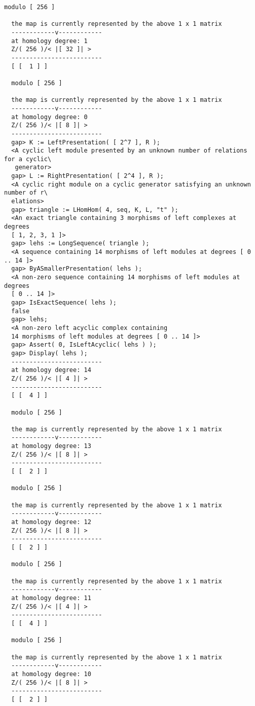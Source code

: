 \documentclass[a4paper,11pt]{report}
\begin{document}
{{{\begin{Verbatim}[fontsize=\small,frame=single,label=Example]
  modulo [ 256 ]
  
  the map is currently represented by the above 1 x 1 matrix
  ------------v------------
  at homology degree: 1
  Z/( 256 )/< |[ 32 ]| > 
  -------------------------
  [ [  1 ] ]
  
  modulo [ 256 ]
  
  the map is currently represented by the above 1 x 1 matrix
  ------------v------------
  at homology degree: 0
  Z/( 256 )/< |[ 8 ]| > 
  -------------------------
  gap> K := LeftPresentation( [ 2^7 ], R );
  <A cyclic left module presented by an unknown number of relations for a cyclic\
   generator>
  gap> L := RightPresentation( [ 2^4 ], R );
  <A cyclic right module on a cyclic generator satisfying an unknown number of r\
  elations>
  gap> triangle := LHomHom( 4, seq, K, L, "t" );
  <An exact triangle containing 3 morphisms of left complexes at degrees 
  [ 1, 2, 3, 1 ]>
  gap> lehs := LongSequence( triangle );
  <A sequence containing 14 morphisms of left modules at degrees [ 0 .. 14 ]>
  gap> ByASmallerPresentation( lehs );
  <A non-zero sequence containing 14 morphisms of left modules at degrees 
  [ 0 .. 14 ]>
  gap> IsExactSequence( lehs );
  false
  gap> lehs;
  <A non-zero left acyclic complex containing 
  14 morphisms of left modules at degrees [ 0 .. 14 ]>
  gap> Assert( 0, IsLeftAcyclic( lehs ) );
  gap> Display( lehs );
  -------------------------
  at homology degree: 14
  Z/( 256 )/< |[ 4 ]| > 
  -------------------------
  [ [  4 ] ]
  
  modulo [ 256 ]
  
  the map is currently represented by the above 1 x 1 matrix
  ------------v------------
  at homology degree: 13
  Z/( 256 )/< |[ 8 ]| > 
  -------------------------
  [ [  2 ] ]
  
  modulo [ 256 ]
  
  the map is currently represented by the above 1 x 1 matrix
  ------------v------------
  at homology degree: 12
  Z/( 256 )/< |[ 8 ]| > 
  -------------------------
  [ [  2 ] ]
  
  modulo [ 256 ]
  
  the map is currently represented by the above 1 x 1 matrix
  ------------v------------
  at homology degree: 11
  Z/( 256 )/< |[ 4 ]| > 
  -------------------------
  [ [  4 ] ]
  
  modulo [ 256 ]
  
  the map is currently represented by the above 1 x 1 matrix
  ------------v------------
  at homology degree: 10
  Z/( 256 )/< |[ 8 ]| > 
  -------------------------
  [ [  2 ] ]
  

\end{Verbatim}}}}
\end{document}
